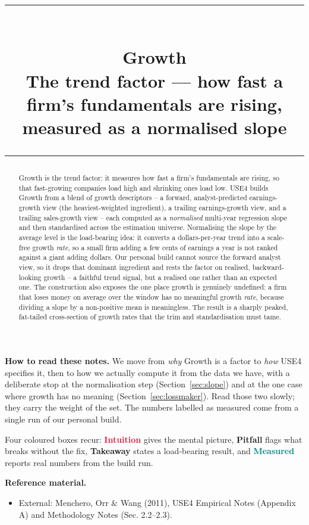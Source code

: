 \documentclass[11pt]{article}
\title{\vspace{-2.2em}
  {\color{steel}\rule{\textwidth}{1.3pt}}\\[0.7em]
  \Huge\bfseries Growth\\[0.35em]
  \large\mdseries The trend factor --- how fast a firm's fundamentals are rising, measured as a normalised slope\\[0.4em]
  {\color{steel}\rule{\textwidth}{0.7pt}}}
\author{}
\date{}
\theoremstyle{definition}
\theoremstyle{plain}
\theoremstyle{remark}
\begin{document}
\maketitle
\thispagestyle{empty}

\begin{abstract}
Growth is the trend factor: it measures how fast a firm's fundamentals are rising, so that fast-growing companies load high and shrinking ones load low. USE4 builds Growth from a blend of growth descriptors -- a forward, analyst-predicted earnings-growth view (the heaviest-weighted ingredient), a trailing earnings-growth view, and a trailing sales-growth view -- each computed as a \emph{normalised} multi-year regression slope and then standardised across the estimation universe. Normalising the slope by the average level is the load-bearing idea: it converts a dollars-per-year trend into a scale-free growth \emph{rate}, so a small firm adding a few cents of earnings a year is not ranked against a giant adding dollars. Our personal build cannot source the forward analyst view, so it drops that dominant ingredient and rests the factor on realised, backward-looking growth -- a faithful trend signal, but a realised one rather than an expected one. The construction also exposes the one place growth is genuinely undefined: a firm that loses money on average over the window has no meaningful growth \emph{rate}, because dividing a slope by a non-positive mean is meaningless. The result is a sharply peaked, fat-tailed cross-section of growth rates that the trim and standardisation must tame.
\end{abstract}

\begin{tcolorbox}[colback=paperlt,colframe=ink!30,boxrule=0.4pt,arc=2pt,left=10pt,right=10pt,top=8pt,bottom=8pt]
\textbf{How to read these notes.} We move from \emph{why} Growth is a factor to \emph{how} USE4 specifies it, then to how we actually compute it from the data we have, with a deliberate stop at the normalisation step (Section~\ref{sec:slope}) and at the one case where growth has no meaning (Section~\ref{sec:lossmaker}). Read those two slowly; they carry the weight of the set. The numbers labelled as measured come from a single run of our personal build.

\smallskip
Four coloured boxes recur: \textcolor{crimson}{\textbf{Intuition}} gives the mental picture, \textcolor{amber}{\textbf{Pitfall}} flags what breaks without the fix, \textcolor{steel}{\textbf{Takeaway}} states a load-bearing result, and \textcolor{teal}{\textbf{Measured}} reports real numbers from the build run.

\smallskip
\textbf{Reference material.}
\begin{itemize}[leftmargin=1.4em,topsep=2pt]
  \item External: Menchero, Orr \& Wang (2011), USE4 Empirical Notes (Appendix A) and Methodology Notes (Sec. 2.2--2.3).
\end{itemize}
\end{tcolorbox}
\end{document}
